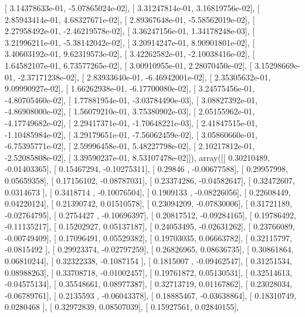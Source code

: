 \documentclass{article}
\begin{document}
       [  3.14378633e-01,  -5.07865024e-02],
       [  3.31247814e-01,   3.16819756e-02],
       [  2.85943414e-01,   4.68327671e-02],
       [  2.89367648e-01,  -5.58562019e-02],
       [  2.27958492e-01,  -2.46219578e-02],
       [  3.36247156e-01,   1.34178248e-03],
       [  3.21996211e-01,  -5.38142042e-02],
       [  3.20914247e-01,   8.90901801e-02],
       [  3.40603192e-01,   9.62319573e-02],
       [  3.42262582e-01,  -2.10038416e-02],
       [  1.64582107e-01,   6.73577265e-02],
       [  3.00910955e-01,   2.28070450e-02],
       [  3.15298669e-01,  -2.37171238e-02],
       [  2.83933640e-01,  -6.46942001e-02],
       [  2.35305632e-01,   9.09990927e-02],
       [  1.66262938e-01,  -6.17700080e-02],
       [  3.24575456e-01,  -4.80705460e-02],
       [  1.77881954e-01,  -3.03784490e-03],
       [  3.08827392e-01,  -4.86908000e-02],
       [  1.56079210e-01,   3.75380902e-03],
       [  2.05155962e-01,  -4.17749682e-02],
       [  2.29417371e-01,  -1.70648221e-03],
       [  2.41847515e-01,  -1.10485984e-02],
       [  3.29179651e-01,  -7.56062459e-02],
       [  3.05860660e-01,  -6.75395771e-02],
       [  2.59996458e-01,   5.48227798e-02],
       [  2.10217812e-01,  -2.52085808e-02],
       [  3.39590237e-01,   8.53107478e-02]]), array([[ 0.30210489, -0.01403365],
       [ 0.15467294, -0.10275311],
       [ 0.29846   , -0.00677588],
       [ 0.29957998,  0.05659358],
       [ 0.17156102, -0.08787031],
       [ 0.23374286, -0.04582647],
       [ 0.32472607,  0.0314673 ],
       [ 0.3418714 , -0.10076504],
       [ 0.1909133 , -0.08226056],
       [ 0.22608449,  0.04220124],
       [ 0.21390742,  0.01510578],
       [ 0.23094209, -0.07830006],
       [ 0.31721189, -0.02764795],
       [ 0.2754427 , -0.10696397],
       [ 0.20817512, -0.09284165],
       [ 0.19786492, -0.11135217],
       [ 0.15202927,  0.05137187],
       [ 0.24053495, -0.02631262],
       [ 0.23766089, -0.00749409],
       [ 0.17096491,  0.05529382],
       [ 0.19703035,  0.06663782],
       [ 0.32115797, -0.0815492 ],
       [ 0.29923374, -0.02797259],
       [ 0.26826965,  0.08636735],
       [ 0.30861864,  0.06810244],
       [ 0.32322338, -0.1087154 ],
       [ 0.1815007 , -0.09462547],
       [ 0.31251534,  0.08988263],
       [ 0.33708718, -0.01002457],
       [ 0.19761872,  0.05130531],
       [ 0.32514613, -0.04575134],
       [ 0.35548661,  0.08977387],
       [ 0.32713719,  0.01167862],
       [ 0.23028034, -0.06789761],
       [ 0.2135593 , -0.06043378],
       [ 0.18885467, -0.03638864],
       [ 0.18310749,  0.0280468 ],
       [ 0.32972839,  0.08507039],
       [ 0.15927561,  0.02840155],
\end{document}
